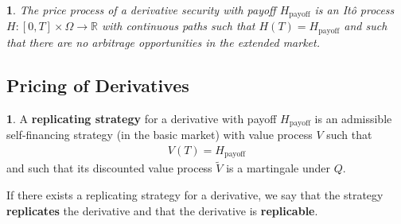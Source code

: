 \documentclass[english]{article}
\newcommand{\comment}[1]{\color{blue}#1\color{black}}
\numberwithin{equation}{section}
\numberwithin{figure}{section}
\theoremstyle{bolddescit}
\theoremstyle{definition}
\newtheorem{definition}[theorem]{\protect\definitionname}
\theoremstyle{definition}
\theoremstyle{plain}
\theoremstyle{plain}
\theoremstyle{bolddesc}
\newtheorem{assumption}[theorem]{\protect\assumptionname}
\theoremstyle{plain}
\theoremstyle{remark}
\providecommand{\assumptionname}{Assumption}
\providecommand{\definitionname}{Definition}
\begin{document}
\begin{assumption}\label{ass:bs-derivative-regularity}
  The price process of a derivative security with payoff $H_\text{payoff}$ is an It\^o process $H : [0,T] \times \Omega \to \mathbb{R}$ with continuous paths such that $H(T) = H_\text{payoff}$ and such that there are no arbitrage opportunities in the extended market.
\end{assumption}

\subsection{Pricing of Derivatives}


\begin{definition}
  A \textbf{replicating strategy} for a derivative with payoff $H_\text{payoff}$ is an admissible self-financing strategy (in the basic market) with value process $V$ such that
  \begin{align*}
    V(T) = H_\text{payoff}
  \end{align*}
  and such that its discounted value process $\widetilde{V}$ is a martingale under $Q$.
\end{definition}

If there exists a replicating strategy for a derivative, we say that the strategy \textbf{replicates} the derivative and that the derivative is \textbf{replicable}.
\end{document}
